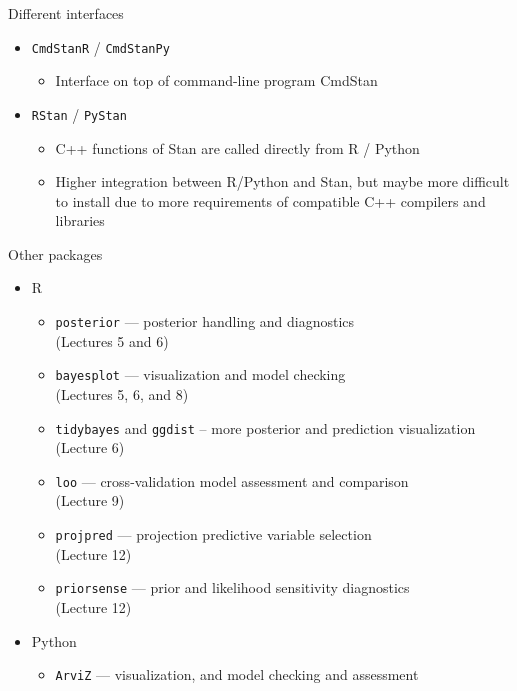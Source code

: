 \documentclass[finnish,english,t]{beamer}
\begin{document}
\begin{frame}{Different interfaces}

  \begin{itemize}
  \item \texttt{CmdStanR} / \texttt{CmdStanPy}
    \begin{itemize}
    \item Interface on top of command-line program CmdStan
    \end{itemize}
  \item \texttt{RStan} / \texttt{PyStan}
    \begin{itemize}
    \item C++ functions of Stan are called directly from R / Python
    \item Higher integration between R/Python and Stan, but maybe more
      difficult to install due to more requirements of compatible C++
      compilers and libraries
    \end{itemize}
  \end{itemize}

\end{frame} 

\begin{frame}{Other packages}

  \begin{itemize}
  \item R
    \begin{itemize}
    \item \texttt{posterior} --- posterior handling and diagnostics\\ (Lectures 5 and 6)
    \item \texttt{bayesplot} --- visualization and model checking\\ (Lectures 5, 6, and 8)
    \item \texttt{tidybayes} and \texttt{ggdist} -- more posterior and prediction visualization (Lecture 6)
    \item \texttt{loo} --- cross-validation model assessment and comparison\\ (Lecture 9)
    \item \texttt{projpred} --- projection predictive variable selection\\ (Lecture 12)
    \item \texttt{priorsense} --- prior and likelihood sensitivity
      diagnostics\\ (Lecture 12)
    \end{itemize}
    \vspace{\baselineskip}
  \item Python
    \begin{itemize}
    \item \texttt{ArviZ} --- visualization, and model checking and assessment
    \end{itemize}
  \end{itemize}

\end{frame} 
\end{document}
